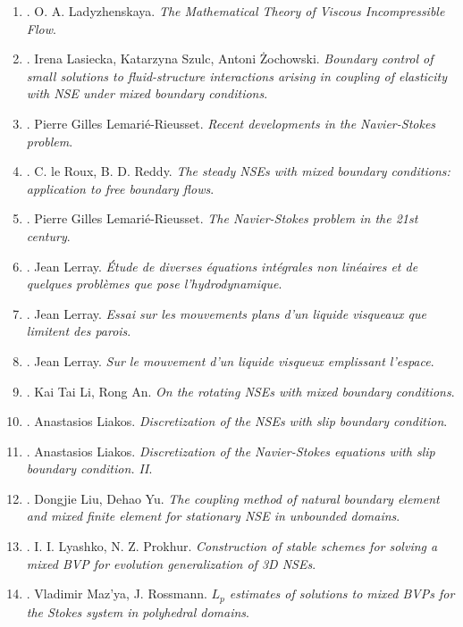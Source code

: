 \documentclass{article}
\begin{document}
\begin{enumerate}
	\item \cite{Ladyzhenskaya1969}. {\sc O. A. Ladyzhenskaya}. {\it The Mathematical Theory of Viscous Incompressible Flow}.
	\item \cite{Lasiecka_Szulc_Zochowski2018}. {\sc Irena Lasiecka, Katarzyna Szulc, Antoni \.{Z}ochowski}. {\it Boundary control of small solutions to fluid-structure interactions arising in coupling of elasticity with NSE under mixed boundary conditions}.
	\item \cite{Lemarie-Rieusset2002}. {\sc Pierre Gilles Lemari\'{e}-Rieusset}. {\it Recent developments in the Navier-Stokes problem}.
	\item \cite{le-Roux_Reddy1993}. {\sc C. le Roux, B. D. Reddy}. {\it The steady NSEs with mixed boundary conditions: application to free boundary flows}.
	\item \cite{Lemarie-Rieusset2016}. {\sc Pierre Gilles Lemari\'{e}-Rieusset}. {\it The Navier-Stokes problem in the 21st century}.
	\item \cite{Leray1933}. {\sc Jean Lerray}. {\it \'{E}tude de diverses \'{e}quations int\'{e}grales non lin\'{e}aires et de quelques probl\`emes que pose l'hydrodynamique}.
	\item \cite{Leray1934a}. {\sc Jean Lerray}. {\it Essai sur les mouvements plans d'un liquide visqueaux que limitent des parois}.
	\item \cite{Leray1934b}. {\sc Jean Lerray}. {\it Sur le mouvement d'un liquide visqueux emplissant l'espace}.
	\item \cite{Li_An2008}. {\sc Kai Tai Li, Rong An}. {\it On the rotating NSEs with mixed boundary conditions}.
	\item \cite{Liakos2001}. {\sc Anastasios Liakos}. {\it Discretization of the NSEs with slip boundary condition}.
	\item \cite{Liakos2004}. {\sc Anastasios Liakos}. {\it Discretization of the Navier-Stokes equations with slip boundary condition. II}.
	\item \cite{Liu_Yu2008}. {\sc Dongjie Liu, Dehao Yu}. {\it The coupling method of natural boundary element and mixed finite element for stationary NSE in unbounded domains}.
	\item \cite{Lyashko_Prokhur1985}. {\sc I. I. Lyashko, N. Z. Prokhur}. {\it Construction of stable schemes for solving a mixed BVP for evolution generalization of 3D NSEs}.
	\item \cite{Mazya_Rossmann2007}. {\sc Vladimir Maz'ya, J. Rossmann}. {\it$L_p$ estimates of solutions to mixed BVPs for the Stokes system in polyhedral domains}.

\end{enumerate}
\end{document}
